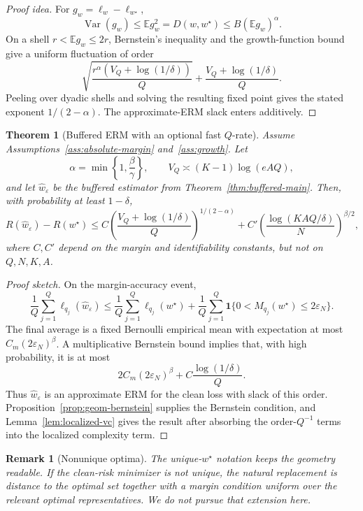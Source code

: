 \documentclass[11pt]{article}
\newtheorem{theorem}{Theorem}
\newtheorem{remark}{Remark}
\newcommand{\E}{\mathbb E}
\newcommand{\one}{\mathbf 1}
\newcommand{\what}{\widehat w}
\newcommand{\wstar}{w^\star}
\newcommand{\eps}{\varepsilon}
\begin{document}
\begin{proof}[Proof idea]
For $g_w=\ell_w-\ell_{\wstar}$,
\[
\operatorname{Var}(g_w)
\le
\E g_w^2
=
D(w,\wstar)
\le
B(\E g_w)^\alpha.
\]
On a shell $r<\E g_w\le2r$, Bernstein's inequality and the growth-function bound give a uniform fluctuation of order
\[
\sqrt{\frac{r^\alpha(V_Q+\log(1/\delta))}{Q}}
+
\frac{V_Q+\log(1/\delta)}{Q}.
\]
Peeling over dyadic shells and solving the resulting fixed point gives the stated exponent $1/(2-\alpha)$.  The approximate-ERM slack enters additively.
\end{proof}

\begin{theorem}[Buffered ERM with an optional fast $Q$-rate]
\label{thm:fast}
Assume Assumptions~\ref{ass:absolute-margin} and~\ref{ass:growth}.  Let
\[
\alpha=\min\left\{1,\frac\beta\gamma\right\},
\qquad
V_Q\asymp (K-1)\log(eAQ),
\]
and let $\what_\eps$ be the buffered estimator from Theorem~\ref{thm:buffered-main}.  Then, with probability at least $1-\delta$,
\[
R(\what_\eps)-R(\wstar)
\le
C
\left(
\frac{V_Q+\log(1/\delta)}{Q}
\right)^{1/(2-\alpha)}
+
C'
\left(
\frac{\log(KAQ/\delta)}{N}
\right)^{\beta/2},
\]
where $C,C'$ depend on the margin and identifiability constants, but not on $Q,N,K,A$.
\end{theorem}

\begin{proof}[Proof sketch]
On the margin-accuracy event,
\[
\frac1Q\sum_{j=1}^Q\ell_{q_j}(\what_\eps)
\le
\frac1Q\sum_{j=1}^Q\ell_{q_j}(\wstar)
+
\frac1Q\sum_{j=1}^Q
\one\{0<M_{q_j}(\wstar)\le2\eps_N\}.
\]
The final average is a fixed Bernoulli empirical mean with expectation at most $C_m(2\eps_N)^\beta$.  A multiplicative Bernstein bound implies that, with high probability, it is at most
\[
2C_m(2\eps_N)^\beta
+
C\frac{\log(1/\delta)}{Q}.
\]
Thus $\what_\eps$ is an approximate ERM for the clean loss with slack of this order.  Proposition~\ref{prop:geom-bernstein} supplies the Bernstein condition, and Lemma~\ref{lem:localized-vc} gives the result after absorbing the order-$Q^{-1}$ terms into the localized complexity term.
\end{proof}

\begin{remark}[Nonunique optima]
The unique-$\wstar$ notation keeps the geometry readable.  If the clean-risk minimizer is not unique, the natural replacement is distance to the optimal set together with a margin condition uniform over the relevant optimal representatives.  We do not pursue that extension here.
\end{remark}
\end{document}
